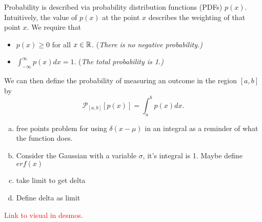 \documentclass[12pt]{amsbook}
\begin{document}
\newpage
\begin{problem}
Probability is described via probability distribution functions (PDFs) $p(x)$. Intuitively, the value of $p(x)$ at the point $x$ describes the weighting of that point $x$. We require that
\begin{itemize}
	\item $p(x)\geq 0$ for all $x\in \mathbb{R}$. (\emph{There is no negative probability.)}
	\item $\displaystyle{\int_{-\infty}^\infty p(x)dx=1}$. (\emph{The total probability is 1.)}
\end{itemize}
We can then define the probability of measuring an outcome in the region $[a,b]$ by
\[
\mathcal{P}_{[a,b]}[p(x)] = \int_a^b p(x)dx.
\]
\begin{enumerate}[(a)]
	\item free points problem for using $\delta(x-\mu)$ in an integral  as a reminder of what the function does.
	\item Consider the Gaussian with a variable $\sigma$, it's integral is 1. Maybe define $erf(x)$
	\item take limit to get delta
	\item Define delta as limit
\end{enumerate}
\textcolor{red}{Link to visual in desmos}.
\end{problem}
\end{document}
